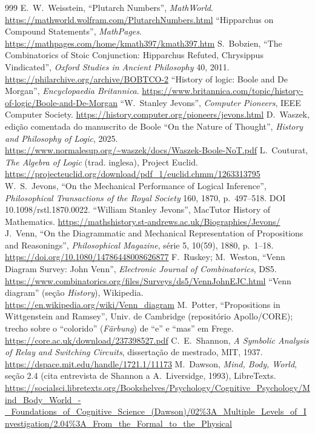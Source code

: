 \begin{thebibliography}{999}
 E.~W.~Weisstein, \enquote{Plutarch Numbers}, \emph{MathWorld}. \url{https://mathworld.wolfram.com/PlutarchNumbers.html}
 \enquote{Hipparchus on Compound Statements}, \emph{MathPages}. \url{https://mathpages.com/home/kmath397/kmath397.htm}
 S.~Bobzien, \enquote{The Combinatorics of Stoic Conjunction: Hipparchus Refuted, Chrysippus Vindicated}, \emph{Oxford Studies in Ancient Philosophy} 40, 2011. \url{https://philarchive.org/archive/BOBTCO-2}
 \enquote{History of logic: Boole and De Morgan}, \emph{Encyclopaedia Britannica}. \url{https://www.britannica.com/topic/history-of-logic/Boole-and-De-Morgan}
 \enquote{W.~Stanley Jevons}, \emph{Computer Pioneers}, IEEE Computer Society. \url{https://history.computer.org/pioneers/jevons.html}
 D.~Waszek, edição comentada do manuscrito de Boole \enquote{On the Nature of Thought}, \emph{History and Philosophy of Logic}, 2025. \url{https://www.normalesup.org/~waszek/docs/Waszek-Boole-NoT.pdf}
 L.~Couturat, \emph{The Algebra of Logic} (trad. inglesa), Project Euclid. \url{https://projecteuclid.org/download/pdf_1/euclid.chmm/1263313795}
 W.~S.~Jevons, \enquote{On the Mechanical Performance of Logical Inference}, \emph{Philosophical Transactions of the Royal Society} 160, 1870, p.~497--518. DOI 10.1098/rstl.1870.0022.
 \enquote{William Stanley Jevons}, MacTutor History of Mathematics. \url{https://mathshistory.st-andrews.ac.uk/Biographies/Jevons/}
 J.~Venn, \enquote{On the Diagrammatic and Mechanical Representation of Propositions and Reasonings}, \emph{Philosophical Magazine}, série 5, 10(59), 1880, p.~1--18. \url{https://doi.org/10.1080/14786448008626877}
 F.~Ruskey; M.~Weston, \enquote{Venn Diagram Survey: John Venn}, \emph{Electronic Journal of Combinatorics}, DS5. \url{https://www.combinatorics.org/files/Surveys/ds5/VennJohnEJC.html}
 \enquote{Venn diagram} (seção \emph{History}), Wikipedia. \url{https://en.wikipedia.org/wiki/Venn_diagram}
 M.~Potter, \enquote{Propositions in Wittgenstein and Ramsey}, Univ. de Cambridge (repositório Apollo/CORE); trecho sobre o \enquote{colorido} (\emph{Färbung}) de \enquote{e} e \enquote{mas} em Frege. \url{https://core.ac.uk/download/237398527.pdf}
 C.~E.~Shannon, \emph{A Symbolic Analysis of Relay and Switching Circuits}, dissertação de mestrado, MIT, 1937. \url{https://dspace.mit.edu/handle/1721.1/11173}
 M.~Dawson, \emph{Mind, Body, World}, seção 2.4 (cita entrevista de Shannon a A.~Liversidge, 1993), LibreTexts. \url{https://socialsci.libretexts.org/Bookshelves/Psychology/Cognitive_Psychology/Mind_Body_World_-_Foundations_of_Cognitive_Science_(Dawson)/02\%3A_Multiple_Levels_of_Investigation/2.04\%3A_From_the_Formal_to_the_Physical}

\end{thebibliography}
